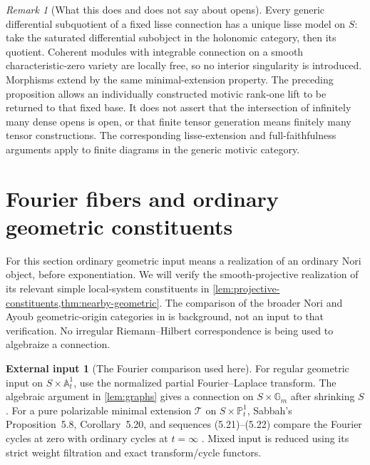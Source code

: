 \documentclass[11pt]{article}
\numberwithin{equation}{section}
\theoremstyle{definition}
\newtheorem{externalinput}[externalinput]{External input}
\theoremstyle{remark}
\newtheorem{remark}[remark]{Remark}
\newcommand{\A}{\mathbb A}
\newcommand{\Gm}{\mathbb G_m}
\begin{document}
\begin{remark}[What this does and does not say about opens]
Every generic differential subquotient of a fixed lisse connection has a
unique lisse model on $S$: take the saturated differential subobject in
the holonomic category, then its quotient. Coherent modules with integrable
connection on a smooth characteristic-zero variety are locally free, so
no interior singularity is introduced. Morphisms extend by the same
minimal-extension property. The preceding proposition allows an
individually constructed motivic rank-one lift to be returned to that
fixed base. It does not assert that the intersection of infinitely many
dense opens is open, or that finite tensor generation means finitely many
tensor constructions. The corresponding lisse-extension and full-faithfulness
arguments apply to finite diagrams in the generic motivic category.
\end{remark}

\section{Fourier fibers and ordinary geometric constituents}\label{sec:fourier}\label{sec:rank-one}

For this section ordinary geometric input means a realization of an
ordinary Nori object, before exponentiation. We will verify the
smooth-projective realization of its relevant simple local-system
constituents in \cref{lem:projective-constituents,thm:nearby-geometric}.
The comparison of the broader Nori and Ayoub geometric-origin categories
in \cite[Corollary~5.15 and Proposition~5.17]{JacobsenComparison} is
background, not an input to that verification. No irregular
Riemann--Hilbert correspondence is being used to algebraize a connection.

\begin{externalinput}[The Fourier comparison used here]\label{input:fourier}
For regular geometric input on $S\times\A^1_t$, use the normalized
partial Fourier--Laplace transform. The algebraic argument in
\cref{lem:graphs} gives a connection on $S\times\Gm$ after shrinking $S$.
For a pure polarizable minimal extension $\mathcal T$ on
$S\times\mathbb P^1_t$, Sabbah's Proposition~5.8, Corollary~5.20, and
sequences (5.21)--(5.22) compare the Fourier cycles at zero with ordinary
cycles at $t=\infty$ \cite{SabbahMonodromy}. Mixed input is reduced using
its strict weight filtration and exact transform/cycle functors.
\end{externalinput}
\end{document}
